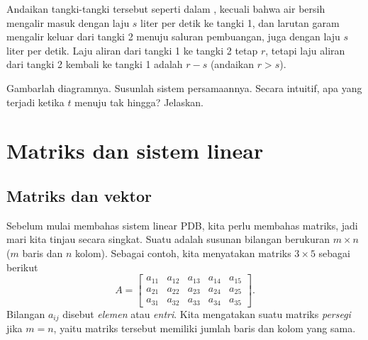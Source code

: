 \begin{exercise}
Andaikan tangki-tangki tersebut seperti dalam
, kecuali bahwa air bersih mengalir masuk
dengan laju $s$ liter per detik ke tangki 1, dan larutan garam mengalir keluar dari tangki 2
menuju saluran pembuangan, juga dengan laju $s$ liter per detik.
Laju aliran dari tangki 1 ke tangki 2 tetap $r$, tetapi laju aliran
dari tangki 2 kembali ke tangki 1 adalah $r-s$ (andaikan $r > s$).
\begin{tasks}
\task Gambarlah diagramnya.
\task Susunlah sistem persamaannya.
\task Secara intuitif, apa yang terjadi ketika $t$ menuju tak hingga? Jelaskan.
\end{tasks}
\end{exercise}


\sectionnewpage
\section{Matriks dan sistem linear} \label{sec:matrix}



\subsection{Matriks dan vektor}

Sebelum mulai membahas sistem linear PDB, kita perlu
membahas matriks, jadi mari kita tinjau secara singkat.  Suatu \emph{}
adalah susunan bilangan berukuran $m
\times n$ ($m$ baris dan $n$ kolom).  Sebagai contoh, kita menyatakan
matriks $3 \times 5$ sebagai berikut
\begin{equation*}
A =
\begin{bmatrix}
a_{11} & a_{12} & a_{13} & a_{14} & a_{15} \\
a_{21} & a_{22} & a_{23} & a_{24} & a_{25} \\
a_{31} & a_{32} & a_{33} & a_{34} & a_{35}
\end{bmatrix} .
\end{equation*}
Bilangan $a_{ij}$ disebut \emph{elemen}
atau \emph{entri}.
Kita mengatakan suatu matriks \emph{persegi}
jika $m=n$, yaitu matriks tersebut memiliki jumlah baris dan kolom yang sama.

